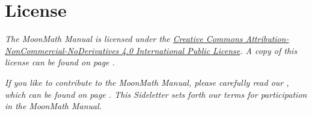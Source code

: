 \chapter*{License}
\itshape{}
The MoonMath Manual is licensed under the \href{https://creativecommons.org/licenses/by-nc-nd/4.0/}{Creative Commons Attribution-NonCommercial-NoDerivatives 4.0 International Public License}. A copy of this license can be found on page \pageref{chapter:license}.

\textit{If you like to contribute to the MoonMath Manual, please carefully read our , which can be found on page \pageref{sideletter}. This Sideletter sets forth our terms for participation in the MoonMath Manual.}

\upshape{}